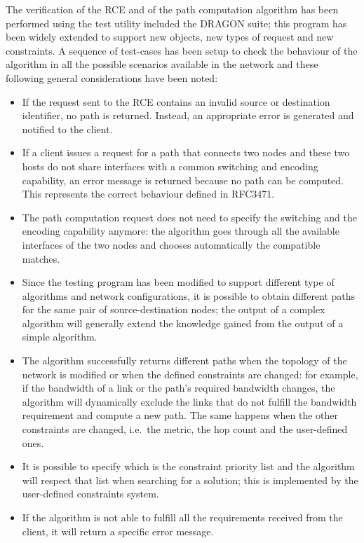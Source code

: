 \documentclass[10pt,a4paper]{report}
\begin{document}
The verification of the RCE and of the path computation algorithm has
been performed using the test utility included the DRAGON suite; this
program has been widely extended to support new objects, new types of
request and new constraints. A sequence of test-cases has been setup
to check the behaviour of the algorithm in all the possible scenarios
available in the network and these following general considerations
have been noted:
\begin{itemize}
\item If the request sent to the RCE contains an invalid source or
  destination identifier, no path is returned. Instead, an appropriate
  error is generated and notified to the client.
\item If a client issues a request for a path that connects two nodes
  and these two hosts do not share interfaces with a common switching
  and encoding capability, an error message is returned because no
  path can be computed. This represents the correct behaviour defined
  in RFC3471.
\item The path computation request does not need to specify the
  switching and the encoding capability anymore: the algorithm goes
  through all the available interfaces of the two nodes and chooses
  automatically the compatible matches.
\item Since the testing program has been modified to support different
  type of algorithms and network configurations, it is possible to
  obtain different paths for the same pair of source-destination
  nodes; the output of a complex algorithm will generally extend the
  knowledge gained from the output of a simple algorithm.
\item The algorithm successfully returns different paths when the
  topology of the network is modified or when the defined constraints
  are changed: for example, if the bandwidth of a link or the path's
  required bandwidth changes, the algorithm will dynamically exclude
  the links that do not fulfill the bandwidth requirement and compute
  a new path. The same happens when the other constraints are changed,
  i.e.\ the metric, the hop count and the user-defined ones.
\item It is possible to specify which is the constraint priority list and
  the algorithm will respect that list when searching for a solution;
  this is implemented by the user-defined constraints system.
\item If the algorithm is not able to fulfill all the requirements
  received from the client, it will return a specific error message.
\end{itemize}
\end{document}
